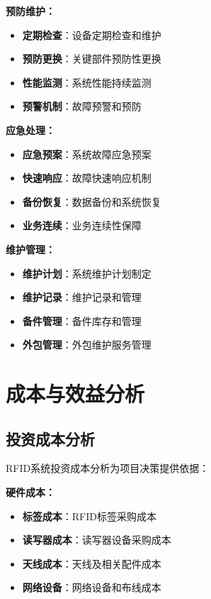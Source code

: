 \documentclass[12pt,UTF8]{ctexbook}
\begin{document}
\begin{itemize}[leftmargin=3.5em]
\begin{itemize}[leftmargin=3.5em]
\begin{itemize}[leftmargin=3.5em]
\begin{itemize}[leftmargin=3.5em]
\textbf{预防维护：}
\begin{itemize}[leftmargin=3.5em]
    \item \textbf{定期检查}：设备定期检查和维护
    \item \textbf{预防更换}：关键部件预防性更换
    \item \textbf{性能监测}：系统性能持续监测
    \item \textbf{预警机制}：故障预警和预防
\end{itemize}

\textbf{应急处理：}
\begin{itemize}[leftmargin=3.5em]
    \item \textbf{应急预案}：系统故障应急预案
    \item \textbf{快速响应}：故障快速响应机制
    \item \textbf{备份恢复}：数据备份和系统恢复
    \item \textbf{业务连续}：业务连续性保障
\end{itemize}

\textbf{维护管理：}
\begin{itemize}[leftmargin=3.5em]
    \item \textbf{维护计划}：系统维护计划制定
    \item \textbf{维护记录}：维护记录和管理
    \item \textbf{备件管理}：备件库存和管理
    \item \textbf{外包管理}：外包维护服务管理
\end{itemize}

\chapter{成本与效益分析}

\section{投资成本分析}

RFID系统投资成本分析为项目决策提供依据：

\textbf{硬件成本：}
\begin{itemize}[leftmargin=3.5em]
    \item \textbf{标签成本}：RFID标签采购成本
    \item \textbf{读写器成本}：读写器设备采购成本
    \item \textbf{天线成本}：天线及相关配件成本
    \item \textbf{网络设备}：网络设备和布线成本
\end{itemize}


\end{itemize}
\end{itemize}
\end{itemize}
\end{itemize}
\end{document}
